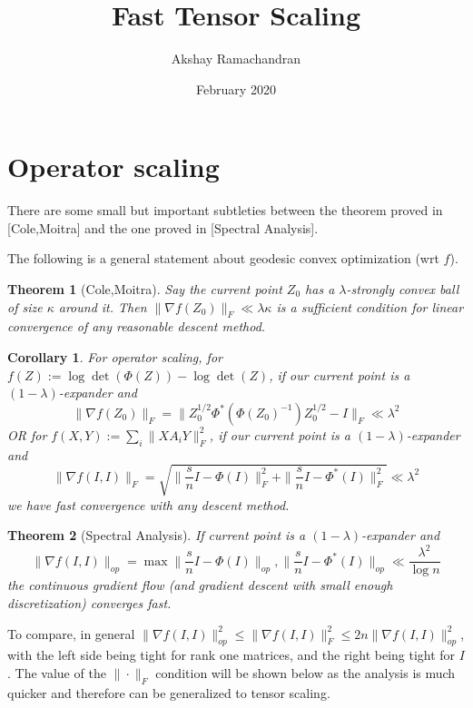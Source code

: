 \documentclass{article}
\title{Fast Tensor Scaling}
\author{Akshay Ramachandran }
\date{February 2020}
\newtheorem{theorem}{Theorem}
\newtheorem{corollary}{Corollary}
\begin{document}
\maketitle



\section{Operator scaling}

There are some small but important subtleties between the theorem proved in [Cole,Moitra] and the one proved in [Spectral Analysis]. 

The following is a general statement about geodesic convex optimization (wrt $f$).
\begin{theorem} [Cole,Moitra]
Say the current point $Z_{0}$ has a $\lambda$-strongly convex ball of size $\kappa$ around it. Then $\|\nabla f(Z_{0})\|_{F} \ll \lambda \kappa$ is a sufficient condition for linear convergence of any reasonable descent method. 
\end{theorem}

\begin{corollary}
For operator scaling, for $f(Z) := \log\det(\Phi(Z)) - \log\det(Z)$, if our current point is a $(1 - \lambda)$-expander and 
\[ \|\nabla f(Z_{0})\|_{F} = \|Z_{0}^{1/2} \Phi^{*}( \Phi(Z_{0})^{-1} ) Z_{0}^{1/2} - I\|_{F} \ll \lambda^{2}   \]
\emph{OR} for $f(X,Y) := \sum_{i} \|X A_{i} Y\|_{F}^{2}$, if our current point is a $(1 - \lambda)$-expander and 
\[ \|\nabla f(I,I)\|_{F} = \sqrt{\|\frac{s}{n} I - \Phi(I)\|_{F}^{2} + \|\frac{s}{n} I - \Phi^{*}(I) \|_{F}^{2}} \ll \lambda^{2}     \]
we have fast convergence with any descent method. 
\end{corollary}

\begin{theorem} [Spectral Analysis]If current point is a $(1 - \lambda)$-expander and 
\[  \|\nabla f(I,I)\|_{op} = \max{ \|\frac{s}{n} I - \Phi(I)\|_{op}, \|\frac{s}{n} I - \Phi^{*}(I) \|_{op} } \ll \frac{\lambda^{2}}{\log n}  \]
the continuous gradient flow (and gradient descent with small enough discretization) converges fast. 
\end{theorem}

To compare, in general $\|\nabla f(I,I)\|_{op}^{2} \leq \|\nabla f(I,I)\|_{F}^{2} \leq 2n \|\nabla f(I,I)\|_{op}^{2}$, with the left side being tight for rank one matrices, and the right being tight for $I$. The value of the $\|\cdot\|_{F}$ condition will be shown below as the analysis is much quicker and therefore can be generalized to tensor scaling. 
\end{document}
